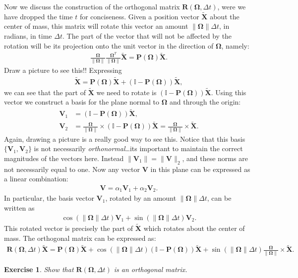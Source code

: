 \documentclass[10pt]{article}
\newtheorem{myexer}{Exercise}
\newcommand{\bs}[1]{{\boldsymbol #1}}
\begin{document}
Now we discuss the construction of the orthogonal matrix ${\bs R}({\bs \Omega}, \Delta t)$, were we have dropped the time $t$ for conciseness.  Given a position vector $\tilde{{\bs X}}$ about the center of mass, this matrix will rotate this vector an amount $\|{\bs \Omega}\|\Delta t$, in radians, in time $\Delta t$.  The part of the vector that will not be affected by the rotation will be its projection onto the unit vector in the direction of ${\bs \Omega}$, namely:
\begin{align*}
\frac{{\bs \Omega}}{\|{\bs \Omega}\|} \frac{{\bs \Omega}^T}{\|{\bs \Omega}\|} \tilde{\bs X} = {\bs P}({\bs \Omega}) \tilde{\bs X}.
\end{align*} 
Draw a picture to see this!!  Expressing
\begin{align*}
\tilde{\bs X} = {\bs P}({\bs \Omega}) \tilde{\bs X} + (\mathbb{I} - {\bs P}({\bs \Omega})) \tilde{\bs X},
\end{align*}
we can see that the part of $\tilde{\bs X}$ we need to rotate is $(\mathbb{I} - {\bs P}({\bs \Omega})) \tilde{\bs X}.$  Using this vector we construct a basis for the plane normal to ${\bs \Omega}$ and through the origin:
\begin{align*}
{\bs V}_1 &=  (\mathbb{I} - {\bs P}({\bs \Omega})) \tilde{\bs X}, \\
{\bs V}_2 &=  \frac{{\bs \Omega}}{\|{\bs \Omega}\|} \times (\mathbb{I} - {\bs P}({\bs \Omega})) \tilde{\bs X} = \frac{{\bs \Omega}}{\|{\bs \Omega}\|} \times \tilde{\bs X}. 
\end{align*}
Again, drawing a picture is a really good way to see this.  Notice that this basis $\{{\bs V}_1, {\bs V}_2\}$ is not necessarily {\em orthonormal}\ldots its important to maintain the correct magnitudes of the vectors here.  Instead $\|{\bs V}_1\| = \|{\bs V}\|_2$, and these norms are not necessarily equal to one.  Now any vector ${\bs V}$ in this plane can be expressed as a linear combination:
\begin{align*}
{\bs V} = \alpha_1 {\bs V}_1 + \alpha_2 {\bs V}_2.
\end{align*}
In particular, the basis vector ${\bs V}_1$, rotated by an amount $\|{\bs \Omega}\|\Delta t$, can be written as 
\begin{align*}
 \cos(\|{\bs \Omega}\|\Delta t){\bs V}_1 + \sin(\|{\bs \Omega}\|\Delta t){\bs V}_2. 
\end{align*}
This rotated vector is precisely the part of $\tilde{\bs X}$ which  rotates about the center of mass.  The orthogonal matrix can be expressed as:
\begin{align*}
{\bs R}({\bs \Omega}, \Delta t) \tilde{\bs X} = {\bs P}({\bs \Omega}) \tilde{\bs X} +  \cos(\|{\bs \Omega}\|\Delta t) (\mathbb{I} - {\bs P}({\bs \Omega})) \tilde{\bs X} + \sin(\|{\bs \Omega}\|\Delta t) \frac{{\bs \Omega}}{\|{\bs \Omega}\|} \times \tilde{\bs X}.
\end{align*}
\begin{myexer}
Show that ${\bs R}({\bs \Omega}, \Delta t)$ is an orthogonal matrix.
\end{myexer}
\end{document}
